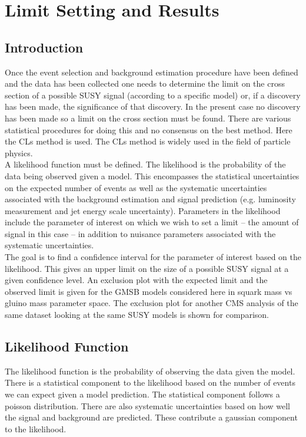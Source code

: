 \chapter{Limit Setting and Results}

\section{Introduction}

Once the event selection and background estimation procedure have been defined
and the data has been collected one needs to determine the limit on the cross
section of a possible SUSY signal (according to a specific model) or, if a 
discovery has been made, the significance of that discovery. In the present case 
no discovery has been made so a limit on the cross section must be found. There 
are various statistical procedures for doing this and no consensus on the best 
method. Here the CLs method is used. The CLs method is widely used in the field 
of particle physics. \\

A likelihood function must be defined. The likelihood is the probability of 
the data being observed given a model. This encompasses the statistical 
uncertainties on the expected number of events as well as the systematic 
uncertainties associated with the background estimation and signal prediction 
(e.g. luminosity measurement and jet energy scale uncertainty). Parameters in 
the likelihood include the parameter of interest on which we wish to set a limit 
-- the amount of signal in this case -- in addition to nuisance parameters 
associated with the systematic uncertainties. \\

The goal is to find a confidence interval for the parameter of interest based
on the likelihood. This gives an upper limit on the size of a possible SUSY 
signal at a given confidence level. An exclusion plot with the expected limit
and the observed limit is given for the GMSB models considered here in squark 
mass vs gluino mass parameter space. The exclusion plot for another CMS analysis
of the same dataset looking at the same SUSY models is shown for comparison.

\section{Likelihood Function}

The likelihood function is the probability of observing the data given the
model. There is a statistical component to the likelihood based on the number of
events we can expect given a model prediction. The statistical component follows
a poisson distribution. There are also systematic uncertainties based on how 
well the signal and background are predicted. These contribute a gaussian
component to the likelihood. \\

